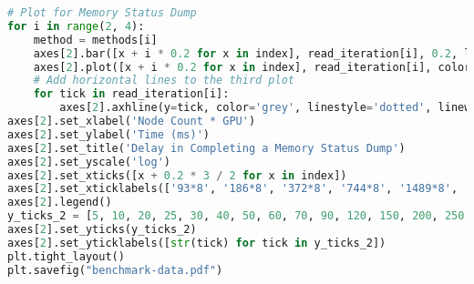 \begin{lstlisting}[language=Python]
# Plot for Memory Status Dump
for i in range(2, 4):
    method = methods[i]
    axes[2].bar([x + i * 0.2 for x in index], read_iteration[i], 0.2, label=method, color=colors[i])
    axes[2].plot([x + i * 0.2 for x in index], read_iteration[i], color=colors[i], marker='o', linewidth=1, markersize=2)
    # Add horizontal lines to the third plot
    for tick in read_iteration[i]:
        axes[2].axhline(y=tick, color='grey', linestyle='dotted', linewidth=0.3)
axes[2].set_xlabel('Node Count * GPU')
axes[2].set_ylabel('Time (ms)')
axes[2].set_title('Delay in Completing a Memory Status Dump')
axes[2].set_yscale('log')
axes[2].set_xticks([x + 0.2 * 3 / 2 for x in index])
axes[2].set_xticklabels(['93*8', '186*8', '372*8', '744*8', '1489*8', '2978*8'])
axes[2].legend()
y_ticks_2 = [5, 10, 20, 25, 30, 40, 50, 60, 70, 90, 120, 150, 200, 250, 300, 400, 500]
axes[2].set_yticks(y_ticks_2)
axes[2].set_yticklabels([str(tick) for tick in y_ticks_2])
plt.tight_layout()
plt.savefig("benchmark-data.pdf")
\end{lstlisting}
